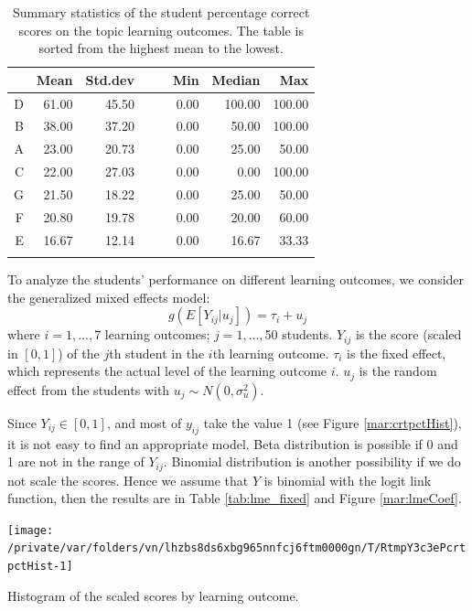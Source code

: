 \documentclass[12pt,english,nohyper]{tufte-handout}\usepackage[]{graphicx}\usepackage[]{color}
\newenvironment{knitrout}{}{} %
\begin{document}
\begin{longtable}{rrrllrrr}
  \hline
 & Mean & Std.dev &   &   & Min & Median & Max \\ 
  \hline
D & 61.00 & 45.50 &  &  & 0.00 & 100.00 & 100.00 \\ 
  B & 38.00 & 37.20 &  &  & 0.00 & 50.00 & 100.00 \\ 
  A & 23.00 & 20.73 &  &  & 0.00 & 25.00 & 50.00 \\ 
  C & 22.00 & 27.03 &  &  & 0.00 & 0.00 & 100.00 \\ 
  G & 21.50 & 18.22 &  &  & 0.00 & 25.00 & 50.00 \\ 
  F & 20.80 & 19.78 &  &  & 0.00 & 20.00 & 60.00 \\ 
  E & 16.67 & 12.14 &  &  & 0.00 & 16.67 & 33.33 \\ 
   \hline
\hline
\caption{Summary statistics of the student percentage correct scores on the topic learning outcomes. The table is sorted from the highest mean to the lowest.} 
\label{tab:LearningObj_summary}
\end{longtable}






To analyze the students' performance on different learning outcomes, we consider the generalized mixed effects model:
\[
g(E[Y_{ij}|u_{j}])= \tau_{i}+u_{j}
\]
where $i=1,...,$7 learning outcomes;
$j=1,...,$50 students. $Y_{ij}$ is the score (scaled in $[0,1]$) of
the $j$th student in the $i$th learning outcome. $\tau_i$ is the fixed effect,
which represents the actual level of the learning outcome $i$.
$u_j$ is the random effect from the students with
$u_{j} \sim N(0,\sigma_{u}^{2})$.

Since $Y_{ij} \in [0,1]$, and most of $y_{ij}$ take the value 1
(see Figure \ref{mar:crtpctHist}), it is not easy to find an appropriate model.
Beta distribution is possible if 0 and 1 are not in the range of $Y_{ij}$.
Binomial distribution is another possibility if we do not scale the scores.
Hence we assume that $Y$ is binomial with the logit link function,
then the results are in Table \ref{tab:lme_fixed} and Figure \ref{mar:lmeCoef}.

\begin{knitrout}
\color{fgcolor}\begin{marginfigure}
\texttt{[image: /private/var/folders/vn/lhzbs8ds6xbg965nnfcj6ftm0000gn/T/RtmpY3c3ePcrtpctHist-1]} \caption[Histogram of the scaled scores by learning outcome]{Histogram of the scaled scores by learning outcome.}\label{mar:crtpctHist}
\end{marginfigure}


\end{knitrout}
\end{document}
